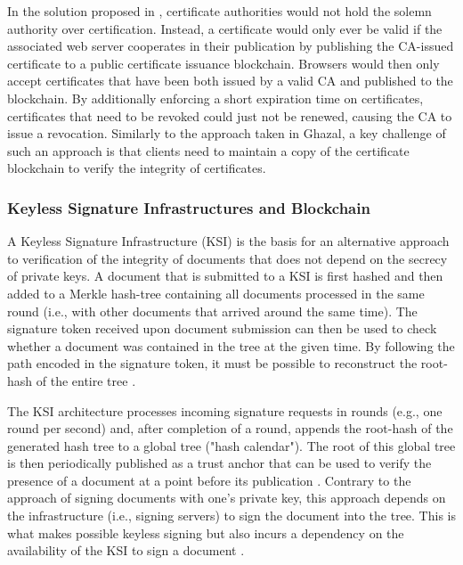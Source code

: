 In the solution proposed in \cite{zohar_blockchain-based_2019}, certificate authorities would not hold the solemn authority over certification. Instead, a certificate would only ever be valid if the associated web server cooperates in their publication by publishing the CA-issued certificate to a public certificate issuance blockchain. Browsers would then only accept certificates that have been both issued by a valid CA and published to the blockchain. By additionally enforcing a short expiration time on certificates, certificates that need to be revoked could just not be renewed, causing the CA to issue a revocation. Similarly to the approach taken in Ghazal, a key challenge of such an approach is that clients need to maintain a copy of the certificate blockchain to verify the integrity of certificates.


\subsubsection{Keyless Signature Infrastructures and Blockchain}

A Keyless Signature Infrastructure (KSI) is the basis for an alternative approach to verification of the integrity of documents that does not depend on the secrecy of private keys. A document that is submitted to a KSI is first hashed and then added to a Merkle hash-tree containing all documents processed in the same round (i.e., with other documents that arrived around the same time). The signature token received upon document submission can then be used to check whether a document was contained in the tree at the given time. By following the path encoded in the signature token, it must be possible to reconstruct the root-hash of the entire tree \cite{hutchison_keyless_2013, jamthagen_blockchain-based_2016}.

The KSI architecture processes incoming signature requests in rounds (e.g., one round per second) and, after completion of a round, appends the root-hash of the generated hash tree to a global tree ("hash calendar"). The root of this global tree is then periodically published as a trust anchor that can be used to verify the presence of a document at a point before its publication \cite{hutchison_keyless_2013}. Contrary to the approach of signing documents with one's private key, this approach depends on the infrastructure (i.e., signing servers) to sign the document into the tree. This is what makes possible keyless signing but also incurs a dependency on the availability of the KSI to sign a document \cite{jamthagen_blockchain-based_2016}.

